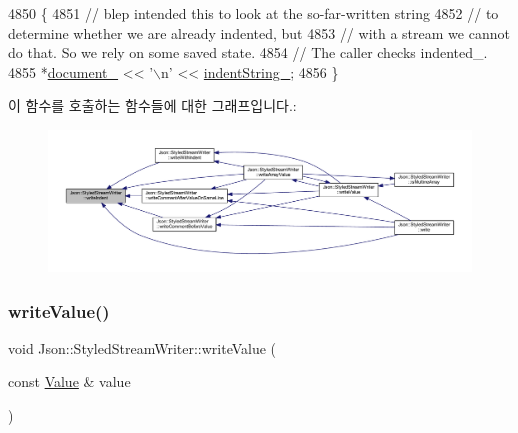 \begin{DoxyCode}
4850                                      \{
4851   \textcolor{comment}{// blep intended this to look at the so-far-written string}
4852   \textcolor{comment}{// to determine whether we are already indented, but}
4853   \textcolor{comment}{// with a stream we cannot do that. So we rely on some saved state.}
4854   \textcolor{comment}{// The caller checks indented\_.}
4855   *\hyperlink{class_json_1_1_styled_stream_writer_aa8c4e4576f5c3dcb10955d133a092dd6}{document\_} << \textcolor{charliteral}{'\(\backslash\)n'} << \hyperlink{class_json_1_1_styled_stream_writer_a1481433ebe1491ea83b0beb92aed56c2}{indentString\_};
4856 \}
\end{DoxyCode}
이 함수를 호출하는 함수들에 대한 그래프입니다.\+:\nopagebreak
\begin{figure}[H]
\begin{center}
\leavevmode
\includegraphics[width=350pt]{class_json_1_1_styled_stream_writer_a5a52fa5b406f1580a61dde3b5638e76d_icgraph}
\end{center}
\end{figure}
\mbox{\label{class_json_1_1_styled_stream_writer_a4359250e09273fa0144021684be001ae}} 
\subsubsection{\texorpdfstring{write\+Value()}{writeValue()}}
{\footnotesize\ttfamily void Json\+::\+Styled\+Stream\+Writer\+::write\+Value (\begin{DoxyParamCaption}\item[{const \hyperlink{class_json_1_1_value}{Value} \&}]{value }\end{DoxyParamCaption})\hspace{0.3cm}{\ttfamily [private]}}




